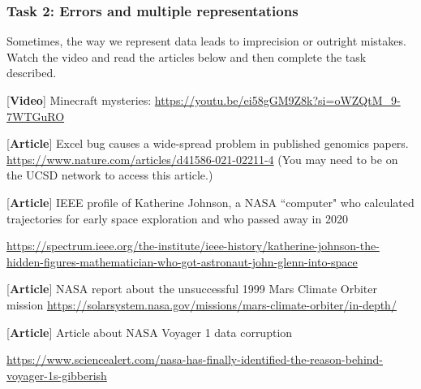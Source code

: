 \documentclass[12pt, oneside]{article}
\begin{document}
\subsubsection*{Task 2: Errors and multiple representations}

Sometimes, the way we represent data leads to imprecision or outright mistakes. 
Watch the video and read the articles below and then complete the task described.


[{\bf Video}] Minecraft mysteries: {\small \url{https://youtu.be/ei58gGM9Z8k?si=oWZQtM_9-7WTGuRO}}

[{\bf Article}]  Excel bug causes a wide-spread problem in published genomics papers.
{\small \url{https://www.nature.com/articles/d41586-021-02211-4}  (You may need to be on the UCSD network to access this article.)}

[{\bf Article}] IEEE profile of Katherine Johnson, a NASA ``computer" who calculated trajectories for 
early space exploration and who passed away in 2020

{\small \url{https://spectrum.ieee.org/the-institute/ieee-history/katherine-johnson-the-hidden-figures-mathematician-who-got-astronaut-john-glenn-into-space}}

[{\bf Article}] NASA report about the unsuccessful 1999 Mars Climate Orbiter mission
{\small \url{https://solarsystem.nasa.gov/missions/mars-climate-orbiter/in-depth/}}

[{\bf Article}] Article about NASA Voyager 1 data corruption

{\small \url{https://www.sciencealert.com/nasa-has-finally-identified-the-reason-behind-voyager-1s-gibberish}}
\end{document}
